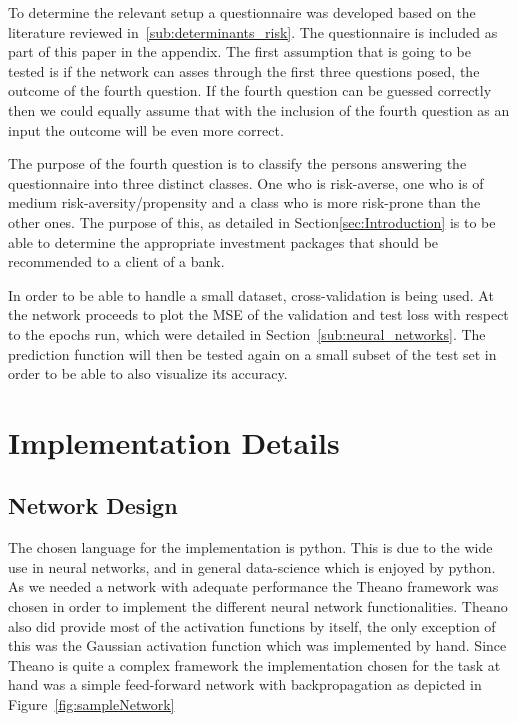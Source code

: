 \documentclass{article}
\begin{document}
To determine the relevant setup a questionnaire was developed based on the literature reviewed in~\ref{sub:determinants_risk}. The questionnaire is included as part of this paper in the appendix. The first assumption that is going to be tested is if the network can asses through the first three questions posed, the outcome of the fourth question. If the fourth question can be guessed correctly then we could equally assume that with the inclusion of the fourth question as an input the outcome will be even more correct. 

The purpose of the fourth question is to classify the persons answering the questionnaire into three distinct classes. One who is risk-averse, one who is of medium risk-aversity/propensity and a class who is more risk-prone than the other ones. The purpose of this, as detailed in Section\ref{sec:Introduction} is to be able to determine the appropriate investment packages that should be recommended to a client of a bank.

In order to be able to handle a small dataset, cross-validation is being used. At the network proceeds to plot the MSE of the validation and test loss with respect to the epochs run, which were detailed in Section~\ref{sub:neural_networks}. The prediction function will then be tested again on a small subset of the test set in order to be able to also visualize its accuracy.

\section{Implementation Details}
\label{sec:implementation_details}

\subsection{Network Design}
\label{sub:network_design}

The chosen language for the implementation is python. This is due to the wide use in neural networks, and in general data-science which is enjoyed by python. As we needed a network with adequate performance the Theano framework was chosen in order to implement the different neural network functionalities. Theano also did provide most of the activation functions by itself, the only exception of this was the Gaussian activation function which was implemented by hand. Since Theano is quite a complex framework the implementation chosen for the task at hand was a simple feed-forward network with backpropagation as depicted in Figure~\ref{fig:sampleNetwork}
\end{document}

